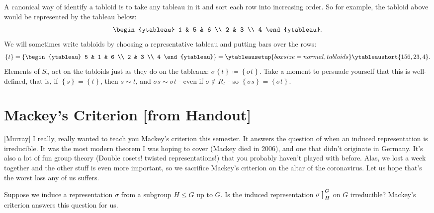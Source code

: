 \documentclass[12pt]{article}
\newcommand\setb[1]{\left \{ #1 \right \}}
\theoremstyle{definition}
\begin{document}
A canonical way of identify a tabloid is to take any tableau in it and sort each row into increasing order. So for example, the tabloid above would be represented by the tableau below:
\begin{equation}
    \begin{ytableau}
            1 & 5 & 6 \\
            2 & 3 \\
            4
        \end{ytableau}.
\end{equation}
We will sometimes write tabloids by choosing a representative tableau and putting bars over the rows:
\begin{equation}
    \setb{t} = 
    \setb{ 
        \begin{ytableau}
            5 & 1 & 6 \\
            2 & 3 \\
            4
        \end{ytableau} 
    } = 
    \ytableausetup{boxsize=normal,tabloids}\ytableaushort{156,23,4}.
\end{equation}
Elements of $S_n$ act on the tabloids just as they do on the tableaux: $\sigma \setb{t} \coloneqq  \setb{ \sigma t}$. Take a moment to persuade yourself that this is well-defined, that is, if $\setb{s} = \setb{t}$, then $s \sim t$, and $\sigma s \sim \sigma t$ - even if $\sigma \notin R_t$ - so $\setb{ \sigma s } = \setb{ \sigma t}$.
\section{Mackey's Criterion [from Handout]}
{\color{blue}
[Murray] I really, really wanted to teach you Mackey's criterion this semester. It answers the question of when an induced representation is irreducible. It was the most modern theorem I was hoping to cover (Mackey died in 2006), and one that didn't originate in Germany. It's also a lot of fun group theory (Double cosets! twisted representations!) that you probably haven't played with before. Alas, we lost a week together and the other stuff is even more important, so we sacrifice Mackey's criterion on the altar of the coronavirus. Let us hope that's the worst loss any of us suffers.
}

Suppose we induce a representation $\sigma$ from a subgroup $H \leq G$ up to $G$. Is the induced representation $\sigma \big\uparrow_H^G$ on $G$ irreducible? Mackey's criterion answers this question for us. 
\end{document}

